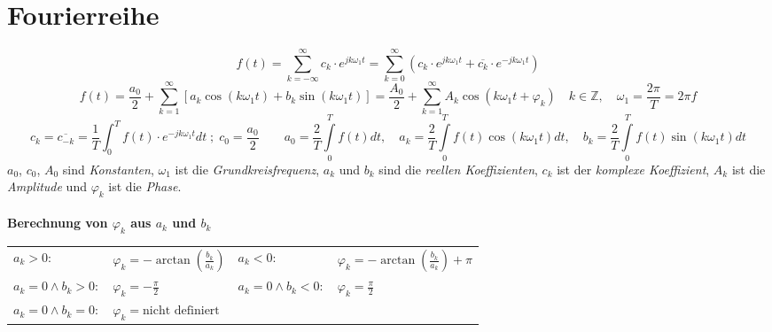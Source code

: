 \newpage
\section{Fourierreihe}
  	$$\boxed{f(t) = \sum\limits_{k = -\infty}^{\infty} c_k \cdot e^{j k \omega_1
  	t}}= \boxed{\sum\limits_{k = 0}^{\infty} \left(c_k \cdot e^{j k \omega_1
  	t} + \overline{c_k} \cdot e^{-j k \omega_1t}\right)}$$
  	$$\boxed{f(t) = \frac{a_0}{2} + \sum\limits_{k=1}^{\infty} \left[a_k \cos(k
  	\omega_1 t) + b_k \sin(k \omega_1 t)\right]}=\boxed{\frac{A_0}{2} +
  	\sum\limits_{k=1}^{\infty} A_k \cos(k \omega_1 t + \varphi_k)} \quad k\in
  	\mathbb{Z}, \quad \omega_1=\frac{2 \pi}{T}=2 \pi f$$	
	$$\boxed{c_k=\overline{c_{-k}}=\frac{1}{T}\int_0^T{f(t)\cdot
	e^{-jk\omega_1
	t}dt} \; ; \; c_0 = \frac{a_0}{2}} \qquad \boxed{a_0 = \frac{2}{T}\int\limits_0^{T}
	f(t)dt, \quad a_k = \frac{2}{T}\int\limits_0^{T} f(t)\cos(k \omega_1 t) dt, \quad b_k =
	\frac{2}{T}\int\limits_0^{T} f(t)\sin(k \omega_1 t) dt}$$
	$a_0$, $c_0$, $A_0$ sind \textit{Konstanten}, $\omega_1$ ist die
	\textit{Grundkreisfrequenz}, $a_k$ und $b_k$ sind die \textit{reellen
	Koeffizienten}, $c_k$ ist der \textit{komplexe Koeffizient}, $A_k$ ist die
	\textit{Amplitude} und $\varphi_k$ ist die \textit{Phase}.\\
	\\

	\textbf{Berechnung von $\varphi_k$ aus $a_k$ und $b_k$}\\
	\begin{tabular}{p{4cm}p{4cm}p{3cm}p{3.5cm}}
		$a_k> 0:$ & $\varphi_k = -\arctan(\frac{b_k}{a_k})$ &
		$a_k<0:$ &	$\varphi_k = -\arctan(\frac{b_k}{a_k}) + \pi$\\
		$a_k = 0 \wedge b_k > 0:$ &	$\varphi_k = -\frac{\pi}{2}$ &
		$a_k = 0 \wedge b_k < 0:$ &	$\varphi_k = \frac{\pi}{2}$\\
		$a_k = 0 \wedge b_k = 0:$ &	$\varphi_k = \text{nicht definiert}$
	\end{tabular}

